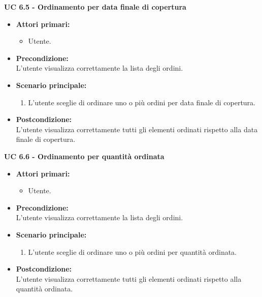 \vspace{0.4cm}

\noindent \textbf{\large UC 6.5 - Ordinamento per data finale di copertura}
\label{uc:ordinamento-data-finale-copertura}
\begin{itemize}

	\item \textbf{Attori primari: }
		\begin{itemize}
			\item Utente.
		\end{itemize}

	\item \textbf{Precondizione: }\\[0.3cm]
		L'utente visualizza correttamente la lista degli ordini.

	\item \textbf{Scenario principale: }
		\begin{enumerate}
			\item L'utente sceglie di ordinare uno o più ordini per data finale di copertura.
		\end{enumerate}
		

	\item \textbf{Postcondizione: }\\[0.3cm]
		L'utente visualizza correttamente tutti gli elementi ordinati rispetto alla data finale di copertura.

\end{itemize}

\vspace{0.4cm}

\noindent \textbf{\large UC 6.6 - Ordinamento per quantità ordinata}
\label{uc:ordinamento-quantita-ordinata}
\begin{itemize}

	\item \textbf{Attori primari: }
		\begin{itemize}
			\item Utente.
		\end{itemize}

	\item \textbf{Precondizione: }\\[0.3cm]
		L'utente visualizza correttamente la lista degli ordini.

	\item \textbf{Scenario principale: }
		\begin{enumerate}
			\item L'utente sceglie di ordinare uno o più ordini per quantità ordinata.
		\end{enumerate}
		

	\item \textbf{Postcondizione: }\\[0.3cm]
		L'utente visualizza correttamente tutti gli elementi ordinati rispetto alla quantità ordinata.

\end{itemize}

